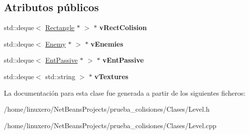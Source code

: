 \subsection*{Atributos públicos}
\begin{DoxyCompactItemize}
\item 
\hypertarget{classLevel_ae89820b0fdd14cd46ca2514e60bc48c9}{std\-::deque$<$ \hyperlink{classRectangle}{Rectangle} $\ast$ $>$ $\ast$ {\bfseries v\-Rect\-Colision}}\label{classLevel_ae89820b0fdd14cd46ca2514e60bc48c9}

\item 
\hypertarget{classLevel_a152a3abd5ccc3b5a4ee24746e47de8d8}{std\-::deque$<$ \hyperlink{classEnemy}{Enemy} $\ast$ $>$ $\ast$ {\bfseries v\-Enemies}}\label{classLevel_a152a3abd5ccc3b5a4ee24746e47de8d8}

\item 
\hypertarget{classLevel_afd01e70ff9b1f291883248505c478fe2}{std\-::deque$<$ \hyperlink{classEntPassive}{Ent\-Passive} $\ast$ $>$ $\ast$ {\bfseries v\-Ent\-Passive}}\label{classLevel_afd01e70ff9b1f291883248505c478fe2}

\item 
\hypertarget{classLevel_a5fdf979abbad91851170753b8c1755d5}{std\-::deque$<$ std\-::string $>$ $\ast$ {\bfseries v\-Textures}}\label{classLevel_a5fdf979abbad91851170753b8c1755d5}

\end{DoxyCompactItemize}


La documentación para esta clase fue generada a partir de los siguientes ficheros\-:\begin{DoxyCompactItemize}
\item 
/home/linuxero/\-Net\-Beans\-Projects/prueba\-\_\-colisiones/\-Clases/Level.\-h\item 
/home/linuxero/\-Net\-Beans\-Projects/prueba\-\_\-colisiones/\-Clases/Level.\-cpp\end{DoxyCompactItemize}
